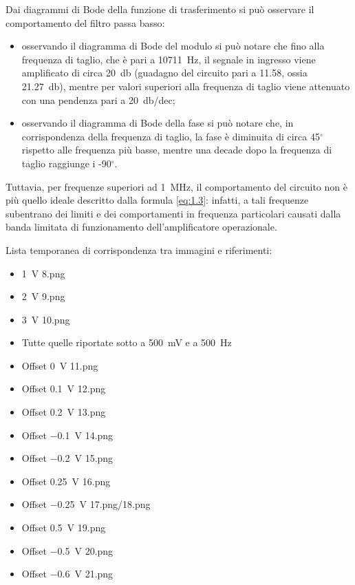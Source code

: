 Dai diagrammi di Bode della funzione di trasferimento si può osservare il comportamento del filtro passa basso:
\begin{itemize}
	\item osservando il diagramma di Bode del modulo si può notare che fino alla frequenza di taglio, che è pari a \SI{10711}{\hertz}, il segnale in ingresso viene amplificato di circa \SI{20}{\decibel} (guadagno del circuito pari a 11.58, ossia \SI{21.27}{\decibel}), mentre per valori superiori alla frequenza di taglio viene attenuato con una pendenza pari a \SI{20}{\decibel}/dec;
	\item osservando il diagramma di Bode della fase si può notare che, in corrispondenza della frequenza di taglio, la fase è diminuita di circa 45$^{\circ}$rispetto alle frequenza più basse, mentre una decade dopo la frequenza di taglio raggiunge i -90$^{\circ}$.
\end{itemize}

Tuttavia, per frequenze superiori ad \SI{1}{\mega\hertz}, il comportamento del circuito non è più quello ideale descritto dalla formula \ref{eq:1.3}: infatti, a tali frequenze subentrano dei limiti e dei comportamenti in frequenza particolari causati dalla banda limitata di funzionamento dell'amplificatore operazionale.

Lista temporanea di corrispondenza tra immagini e riferimenti:
\begin{itemize}
	\item \SI{1}{\volt} 8.png
	\item \SI{2}{\volt} 9.png
	\item \SI{3}{\volt} 10.png
	\item Tutte quelle riportate sotto a \SI{500}{\milli\volt} e a \SI{500}{\hertz}
	\item Offset \SI{0}{\volt} 11.png
	\item Offset \SI{0.1}{\volt} 12.png
	\item Offset \SI{0.2}{\volt} 13.png
	\item Offset \SI{-0.1}{\volt} 14.png
	\item Offset \SI{-0.2}{\volt} 15.png
	\item Offset \SI{+0.25}{\volt} 16.png
	\item Offset \SI{-0.25}{\volt} 17.png/18.png
	\item Offset \SI{+0.5}{\volt} 19.png
	\item Offset \SI{-0.5}{\volt} 20.png
	\item Offset \SI{-0.6}{\volt} 21.png
\end{itemize}

